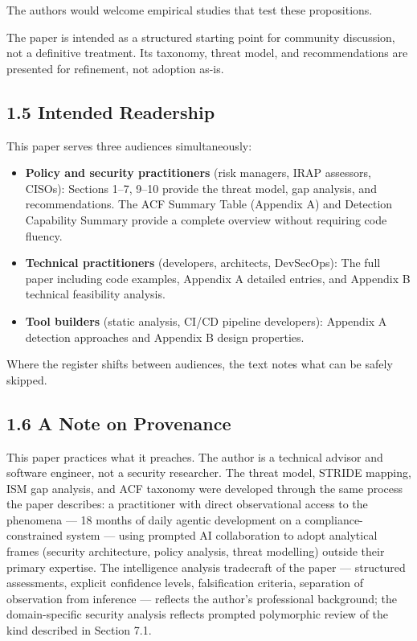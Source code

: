 \documentclass[a4paper,11pt]{report}
\providecommand{\tightlist}{%
  \setlength{\itemsep}{0pt}\setlength{\parskip}{0pt}}
\begin{document}
The authors would welcome empirical studies that test these
propositions.

The paper is intended as a structured starting point for community
discussion, not a definitive treatment. Its taxonomy, threat model, and
recommendations are presented for refinement, not adoption as-is.

\hypertarget{intended-readership}{%
\subsection{1.5 Intended Readership}\label{intended-readership}}

This paper serves three audiences simultaneously:

\begin{itemize}
\tightlist
\item
  \textbf{Policy and security practitioners} (risk managers, IRAP
  assessors, CISOs): Sections 1--7, 9--10 provide the threat model, gap
  analysis, and recommendations. The ACF Summary Table (Appendix A) and
  Detection Capability Summary provide a complete overview without
  requiring code fluency.
\item
  \textbf{Technical practitioners} (developers, architects, DevSecOps):
  The full paper including code examples, Appendix A detailed entries,
  and Appendix B technical feasibility analysis.
\item
  \textbf{Tool builders} (static analysis, CI/CD pipeline developers):
  Appendix A detection approaches and Appendix B design properties.
\end{itemize}

Where the register shifts between audiences, the text notes what can be
safely skipped.

\hypertarget{a-note-on-provenance}{%
\subsection{1.6 A Note on Provenance}\label{a-note-on-provenance}}

This paper practices what it preaches. The author is a technical advisor
and software engineer, not a security researcher. The threat model,
STRIDE mapping, ISM gap analysis, and ACF taxonomy were developed
through the same process the paper describes: a practitioner with direct
observational access to the phenomena --- 18 months of daily agentic
development on a compliance-constrained system --- using prompted AI
collaboration to adopt analytical frames (security architecture, policy
analysis, threat modelling) outside their primary expertise. The
intelligence analysis tradecraft of the paper --- structured
assessments, explicit confidence levels, falsification criteria,
separation of observation from inference --- reflects the author's
professional background; the domain-specific security analysis reflects
prompted polymorphic review of the kind described in Section 7.1.
\end{document}
